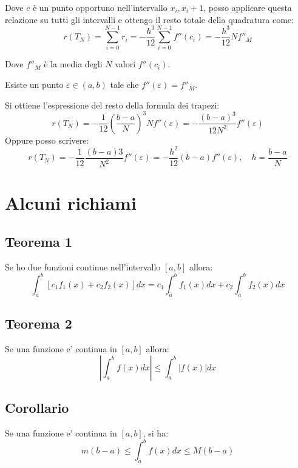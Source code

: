Dove $c$ è un punto opportuno nell'intervallo $x_i, x_i +1$, posso applicare questa relazione su tutti gli intervalli
e ottengo il resto totale della quadratura come:
\begin{equation}
  r(T_N) = \sum_{i = 0}^{N-1} r_i = -\frac{h^3}{12}\sum_{i = 0}^{N-1}  f''(c_i) = -\frac{h^3}{12} N f''_M
\end{equation}

Dove $f''_M$ è la media degli $N$ valori $f''(c_i)$.

Esiste un punto $\varepsilon \in (a, b)$ tale che $f''(\varepsilon) = f''_M$.



Si ottiene l'espressione del resto della formula dei trapezi:
\begin{equation}
  r(T_N) = -\frac{1}{12}(\frac{b-a}{N})^3 N f''(\varepsilon) = -\frac{(b-a)^3}{12N^2}f''(\varepsilon)
\end{equation}
Oppure posso scrivere:
\begin{equation}
  r(T_N) = -\frac{1}{12}\frac{(b-a)3}{N^2} f''(\varepsilon) = -\frac{h^2}{12}(b-a)f''(\varepsilon), \quad h = \frac{b-a}{N}
\end{equation}

\section{Alcuni richiami}
\subsection{Teorema 1}
Se ho due funzioni continue nell'intervallo $[a, b]$ allora:
\begin{equation*}
  \int_a^b [c_1f_1(x) + c_2f_2(x)]dx = c_1\int_a^b f_1(x)dx + c_2\int_a^b f_2(x)dx
\end{equation*}

\subsection{Teorema 2}
Se una funzione e' continua in $[a, b]$ allora:
\begin{equation*}
  |\int_a^b f(x)dx| \leq \int_a^b |f(x)|dx
\end{equation*}

\subsection{Corollario}
Se una funzione e' continua in $[a, b]$, si ha:
\begin{equation*}
  m(b-a) \leq \int_a^b f(x)dx \leq M(b-a)
\end{equation*}

